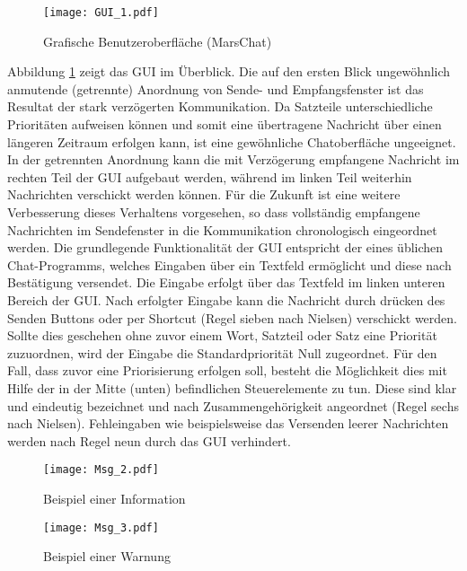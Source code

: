 \begin{figure}[H]
\centering
\texttt{[image: GUI\_1.pdf]}
\caption{Grafische Benutzeroberfläche (MarsChat)}
\label{fig:GUI}
\end{figure}

Abbildung \ref{fig:GUI} zeigt das \gls{GUI} im {\"U}berblick. Die auf den
ersten Blick ungew{\"o}hnlich anmutende (getrennte) Anordnung von Sende- und
Empfangsfenster ist das Resultat der stark verz{\"o}gerten Kommunikation. Da
Satzteile unterschiedliche Priorit{\"a}ten aufweisen k{\"o}nnen und somit eine
{\"u}bertragene Nachricht {\"u}ber einen l{\"a}ngeren Zeitraum erfolgen kann,
ist eine gew{\"o}hnliche Chatoberfl{\"a}che ungeeignet. In der getrennten
Anordnung kann die mit Verz{\"o}gerung empfangene Nachricht im rechten Teil der
\gls{GUI} aufgebaut werden, w{\"a}hrend im linken Teil weiterhin Nachrichten
verschickt werden k{\"o}nnen. F{\"u}r die Zukunft ist eine weitere Verbesserung dieses
Verhaltens vorgesehen, so dass vollst{\"a}ndig empfangene Nachrichten im
Sendefenster in die Kommunikation chronologisch eingeordnet werden. Die
grundlegende Funktionalit{\"a}t der \gls{GUI} entspricht der eines {\"u}blichen
Chat-Programms, welches Eingaben {\"u}ber ein Textfeld erm{\"o}glicht und diese
nach Best{\"a}tigung versendet. Die Eingabe erfolgt {\"u}ber das Textfeld im
linken unteren Bereich der \gls{GUI}. Nach erfolgter Eingabe kann die Nachricht
durch dr{\"u}cken des Senden Buttons oder per Shortcut (Regel sieben nach
Nielsen) verschickt werden.
Sollte dies geschehen ohne zuvor einem Wort, Satzteil oder Satz eine
Priorit{\"a}t zuzuordnen, wird der Eingabe die Standardpriorit{\"a}t Null
zugeordnet. F{\"u}r den Fall, dass zuvor eine Priorisierung erfolgen soll,
besteht die M{\"o}glichkeit dies mit Hilfe der in der Mitte (unten) befindlichen
Steuerelemente zu tun. Diese sind klar und eindeutig bezeichnet und nach
Zusammengeh{\"o}rigkeit angeordnet (Regel sechs nach Nielsen). Fehleingaben wie
beispielsweise das Versenden leerer Nachrichten werden nach Regel neun durch das
\gls{GUI} verhindert.

\begin{figure}[H]
\centering
\texttt{[image: Msg\_2.pdf]}
\caption{Beispiel einer Information}
\label{fig:Msg2}
\end{figure}

\begin{figure}[H]
\centering
\texttt{[image: Msg\_3.pdf]}
\caption{Beispiel einer Warnung}
\label{fig:Msg3}
\end{figure}

